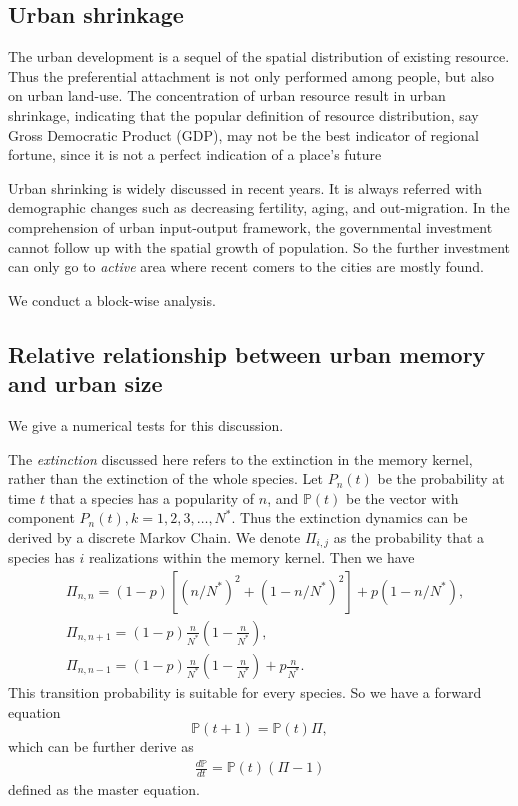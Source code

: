 \documentclass[aps,prl]{revtex4-1}
\begin{document}
\subsection{Urban shrinkage}

The urban development is a sequel of the spatial distribution of existing resource. Thus the preferential attachment is not only performed among people, but also on urban land-use. The concentration of urban resource result in urban shrinkage, indicating that the popular definition of resource distribution, say Gross Democratic Product (GDP), may not be the best indicator of regional fortune, since it is not a perfect indication of a place's future 

Urban shrinking is widely discussed in recent years. It is always referred with demographic changes such as decreasing fertility, aging, and out-migration\cite{haase2008urban}. In the comprehension of urban input-output framework, the governmental investment cannot follow up with the spatial growth of population. So the further investment can only go to \emph{active} area where recent comers to the cities are mostly found. 

We conduct a block-wise analysis.

\subsection{Relative relationship between urban memory and urban size}

We give a numerical tests for this discussion. 

The \emph{extinction} discussed here refers to the extinction in the memory kernel, rather than the extinction of the whole species. Let $P_n(t)$ be the probability at time $t$ that a species has a popularity of $n$, and $\mathbb{P}(t)$ be the vector with component $P_n(t),k = 1,2,3,\dots,N^*$. Thus the extinction dynamics can be derived by a discrete Markov Chain. We denote $\Pi_{i,j}$ as the probability that a species has $i$ realizations within the memory kernel. Then we have \begin{align*}
&\Pi_{n,n} = (1-p)[(n/N^*)^2+(1-n/N^*)^2]+p(1-n/N^*),\\
&\Pi_{n,n+1}=(1-p)\frac{n}{N^*}(1-\frac{n}{N^*}),\\ 
&\Pi_{n,n-1}=(1-p)\frac{n}{N^*}(1-\frac{n}{N^*})+p\frac{n}{N^*}.
\end{align*}
This transition probability is suitable for every species. So we have a forward equation $$ \mathbb{P}(t+1) = \mathbb{P}(t)\Pi, $$which can be further derive as \begin{align*}
\frac{d\mathbb{P}}{dt} = \mathbb{P}(t)(\Pi-1)
\end{align*}
defined as the master equation. 
\end{document}

